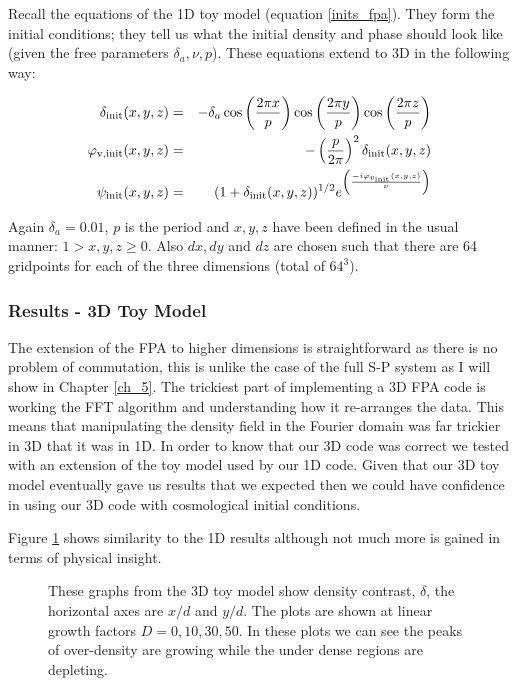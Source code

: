 Recall the equations of the 1D toy model (equation \ref{inits_fpa}). They form the initial conditions; they tell us what the initial density and phase should look like (given the free parameters $\delta_a, \nu, p$). These equations extend to 3D in the following way:

\begin{eqnarray}
\delta_{\rm init}(x,y,z)&=&-\delta_a\cos\left(\frac{2\pi x}{p}\right)\cos\left(\frac{2\pi y}{p}\right)\cos\left(\frac{2\pi z}{p}\right) \\
\varphi_{\rm v,init}(x,y,z) &=& -\left(\frac{p}{2\pi}\right)^2  \delta_{\rm init}(x,y,z) \\
\psi_{\rm init}(x,y,z) &=& (1+\delta_{\rm init}(x,y,z))^{1/2}e^{\left(\frac{-i\varphi_{v_{\rm init}}(x,y,z)}{\nu}\right)}
\end{eqnarray}

Again $\delta_a = 0.01$, $p$ is the period and $x,y,z$ have been defined in the usual manner: 
$ 1> x,y,z \ge 0 $. Also $dx,dy$ and $dz$ are chosen such that there are 64 gridpoints for each of the three dimensions (total of $64^3$).

\subsubsection{Results - 3D Toy Model}
The extension of the FPA to higher dimensions is straightforward as there is no problem of commutation, this is unlike the case of the full S-P system as I will show in Chapter \ref{ch_5}. The trickiest part of implementing a 3D FPA code is working the FFT algorithm and understanding how it re-arranges the data. This means that manipulating the density field in the Fourier domain was far trickier in 3D that it was in 1D. In order to know that our 3D code was correct we tested with an extension of the toy model used by our 1D code. Given that our 3D toy model eventually gave us results that we expected then we could have confidence in using our 3D code with cosmological initial conditions.

Figure \ref{fig.threed} shows similarity to the 1D results although not much more is gained in terms of physical insight.

\begin{figure}[htb]
   \begin{center}
     \leavevmode
                \epsfxsize=80mm
                 \nolinebreak
      		\epsfxsize=80mm
      		\epsfxsize=80mm
                 \nolinebreak
      		\epsfxsize=80mm

   \end{center}
\caption{These graphs from the 3D toy model show density contrast, $\delta$, the horizontal axes are $x/d$ and $y/d$. The plots are shown at linear growth factors $D=0,10,30,50$. In these plots we can see the peaks of over-density are growing while the under dense regions are depleting.}
\label{fig.threed}
\end{figure} 

